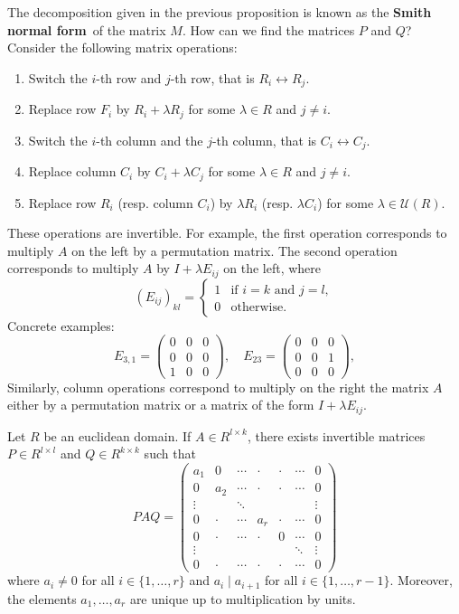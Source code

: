 The decomposition given in the previous proposition is known as 
the \textbf{Smith normal form} of the matrix $M$. 
How can we find the matrices $P$ and $Q$? 
Consider the following matrix operations: 
\begin{enumerate}
	\item Switch the $i$-th row and $j$-th row, that is $R_i\leftrightarrow R_j$.
	\item Replace row $F_i$ by $R_i+\lambda R_j$ for some $\lambda\in R$ and $j\ne i$.
	\item Switch the $i$-th column and the $j$-th column, that is $C_i\leftrightarrow C_j$.
	\item Replace column $C_i$ by $C_i+\lambda C_j$ for some $\lambda\in R$ and $j\ne i$. 
	\item Replace row $R_i$ (resp. column $C_i$) by $\lambda R_i$ (resp. $\lambda C_i$) 
	for some $\lambda\in\mathcal{U}(R)$. 
\end{enumerate}
These operations are invertible. For example, the first operation
corresponds to multiply $A$ on the left by a permutation matrix. 
The second
operation corresponds to multiply $A$ by $I+\lambda E_{ij}$ on the left, 
where 
\[
(E_{ij})_{kl}=\begin{cases}
1 & \text{if $i=k$ and $j=l$},\\
0 & \text{otherwise}.	
\end{cases}
\]
Concrete examples:
\[
E_{3,1}=
\begin{pmatrix}
    0 & 0 & 0\\
    0 & 0 & 0\\
    1 & 0 & 0
\end{pmatrix},
\quad
E_{23}=\begin{pmatrix}
    0 & 0 & 0\\
    0 & 0 & 1\\
    0 & 0 & 0
\end{pmatrix},
\]
Similarly, column operations correspond to multiply on the right the matrix $A$
either by a permutation matrix or a matrix of the form $I+\lambda E_{ij}$. 
  
\begin{theorem}
Let $R$ be an euclidean domain. If $A\in R^{l\times k}$,  
there exists invertible matrices $P\in R^{l\times l}$ and $Q\in R^{k\times k}$ such that 
\[
PAQ=\begin{pmatrix}
a_1 & 0 & \cdots & \cdot & \cdot & \cdots & 0\\
0 & a_2 & \cdots & \cdot & \cdot & \cdots & 0\\
\vdots && \ddots &  & & & \vdots\\	
0 & \cdot & \cdots & a_r & \cdot & \cdots & 0\\	
0 & \cdot & \cdots & \cdot & 0 & \cdots & 0\\	
\vdots &&&&&\ddots &\vdots\\
0 & \cdot & \cdots & \cdot & \cdot & \cdots & 0
\end{pmatrix}
\]
where $a_i\ne0$ for all $i\in\{1,\dots,r\}$ and $a_i\mid a_{i+1}$ for all $i\in\{1,\dots,r-1\}$.
Moreover, the elements $a_1,\dots,a_r$ are unique up to multiplication by
units. 
\end{theorem}

